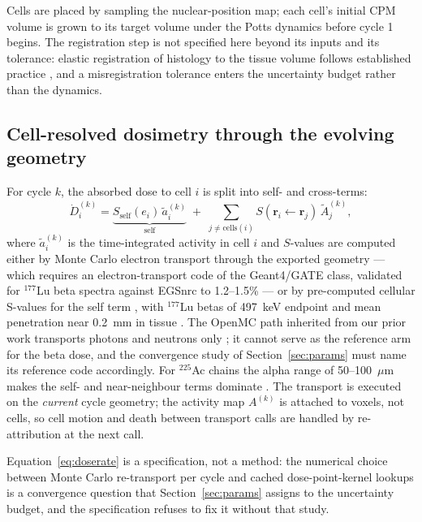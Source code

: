 \documentclass[11pt]{article}
\begin{document}
Cells are placed by sampling the nuclear-position map; each cell's initial CPM volume is
grown to its target volume under the Potts dynamics before cycle 1 begins. The
registration step is not specified here beyond its inputs and its tolerance: elastic
registration of histology to the tissue volume follows established practice
\cite{albers2021}, and a misregistration tolerance enters the uncertainty budget rather
than the dynamics.

\subsection{Cell-resolved dosimetry through the evolving geometry}

For cycle $k$, the absorbed dose to cell $i$ is split into self- and cross-terms:
\begin{equation}
\dot{D}^{(k)}_i = \underbrace{S_{\text{self}}(e_i)\,\tilde{a}^{(k)}_i}_{\text{self}}
\;+\; \sum_{j \neq \text{cells}(i)} S(\bm{r}_i \leftarrow \bm{r}_j)\,
\tilde{A}^{(k)}_j ,
\label{eq:doserate}
\end{equation}
where $\tilde{a}^{(k)}_i$ is the time-integrated activity in cell $i$ and $S$-values are
computed either by Monte Carlo electron transport through the exported geometry ---
which requires an electron-transport code of the Geant4/GATE class, validated for
$^{177}$Lu beta spectra against EGSnrc to 1.2--1.5\% \cite{perrot2014} --- or by
pre-computed cellular S-values for the self term \cite{tamborino2020}, with $^{177}$Lu
betas of 497~keV endpoint and mean penetration near 0.2~mm in tissue
\cite{ijms2026nanoparticle}. The OpenMC path inherited from our prior work transports
photons and neutrons only \cite{kinder2026biofilm}; it cannot serve as the reference
arm for the beta dose, and the convergence study of Section~\ref{sec:params} must
name its reference code accordingly. For $^{225}$Ac chains the
alpha range of 50--100~$\mu$m makes the self- and near-neighbour terms dominate
\cite{sahota2025}. The transport is executed on the \emph{current} cycle geometry; the
activity map $A^{(k)}$ is attached to voxels, not cells, so cell motion and death between
transport calls are handled by re-attribution at the next call.

Equation~\ref{eq:doserate} is a specification, not a method: the numerical choice between
Monte Carlo re-transport per cycle and cached dose-point-kernel lookups is a convergence
question that Section~\ref{sec:params} assigns to the uncertainty budget, and the
specification refuses to fix it without that study.
\end{document}
